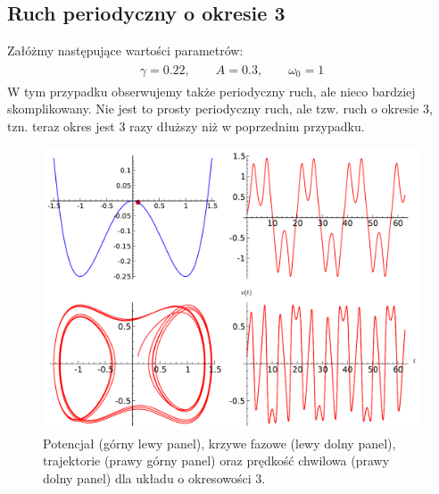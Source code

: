 \documentclass[a4paper,12pt,polish]{sphinxmanual}
\begin{document}
\subsection{Ruch periodyczny o okresie 3}
\label{ch2/chII011:ruch-periodyczny-o-okresie-3}
Załóżmy następujące wartości parametrów:
\label{ch2/chII011:equation-eqn20}\begin{gather}
\begin{split}\gamma = 0.22, \qquad A = 0.3, \qquad \omega_0 = 1\end{split}\label{ch2/chII011-eqn20}
\end{gather}
W tym przypadku obserwujemy także periodyczny ruch, ale nieco bardziej skomplikowany. Nie jest to prosty periodyczny ruch, ale tzw. ruch o okresie 3, tzn. teraz okres jest 3 razy dłuższy niż w poprzednim przypadku.
\begin{figure}[htbp]
\centering
\capstart

\includegraphics{sage_chII011_08.pdf}
\caption{Potencjał (górny lewy panel), krzywe fazowe (lewy dolny panel),
trajektorie (prawy górny panel) oraz prędkość chwilowa (prawy
dolny panel) dla układu o okresowości 3.}\end{figure}
\end{document}
